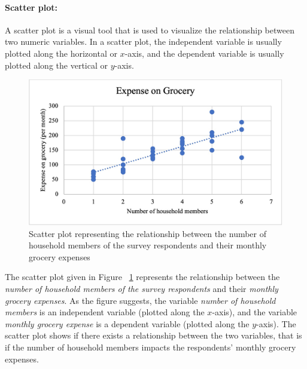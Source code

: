 \documentclass[a4paper, 11pt]{article}
\begin{document}
	\paragraph{Scatter plot:} A scatter plot is a visual tool that is used to visualize the relationship between two numeric variables. In a scatter plot, the independent variable is usually plotted along the horizontal or $x$-axis, and the dependent variable is usually plotted along the vertical or $y$-axis.\\[1ex]
	\begin{figure}[h!]
		\includegraphics[width=\linewidth]{scatter_new.jpg}
		\caption{Scatter plot representing the relationship between the number of household members of the survey respondents and their monthly grocery expenses} 
		\label{fig:scatter}
	\end{figure}
%	
	The scatter plot given in Figure ~\ref{fig:scatter} represents the relationship between the  \emph{number of household members of the survey respondents} and their  \emph{monthly grocery expenses}. As the figure suggests, the variable  \emph{number of household members} is an independent variable (plotted along the $x$-axis), and the variable  \emph{monthly grocery expense} is a dependent variable (plotted along the $y$-axis). The scatter plot shows if there exists a relationship between the two variables, that is if the number of household members impacts the respondents’ monthly grocery expenses.
\end{document}
